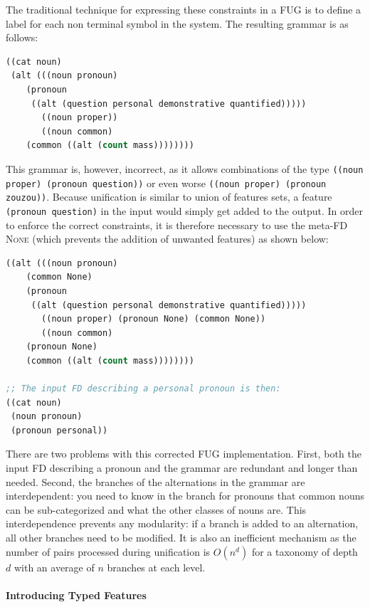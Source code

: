 \documentclass[10pt,a4paper]{report}
\begin{document}
The traditional technique for expressing these constraints in a FUG is to
define a label for each non terminal symbol in the system.  The resulting
grammar is as follows:

\begin{lstlisting}[language=Lisp]
((cat noun)
 (alt (((noun pronoun)
	(pronoun 
	 ((alt (question personal demonstrative quantified)))))
       ((noun proper))
       ((noun common)
	(common ((alt (count mass))))))))
\end{lstlisting}

This grammar is, however, incorrect, as it allows combinations of the type
{\tt ((noun proper) (pronoun question))} or even worse {\tt ((noun proper)
(pronoun zouzou))}.  Because unification is similar to union of features
sets, a feature {\tt (pronoun question)} in the input would simply get added
to the output.  In order to enforce the correct constraints, it is
therefore necessary to use the meta-FD \textsc{None}  (which prevents the addition of unwanted features) as shown below:

\begin{lstlisting}[language=Lisp]
((alt (((noun pronoun)
	(common None)
	(pronoun 
	 ((alt (question personal demonstrative quantified)))))
       ((noun proper) (pronoun None) (common None))
       ((noun common) 
	(pronoun None)
	(common ((alt (count mass))))))))

;; The input FD describing a personal pronoun is then:
((cat noun) 
 (noun pronoun) 
 (pronoun personal))
\end{lstlisting}

There are two problems with this corrected FUG implementation. First,
both the input FD describing a pronoun and the grammar are redundant and
longer than needed.  Second, the branches of the alternations in the
grammar are interdependent: you need to know in the branch for pronouns
that common nouns can be sub-categorized and what the other classes of
nouns are.  This interdependence prevents any modularity: if a branch is
added to an alternation, all other branches need to be modified.  It is
also an inefficient mechanism as the number of pairs processed during
unification is $O(n^d)$ for a taxonomy of depth $d$ with an average of $n$ branches at each level.


\paragraph{Introducing Typed Features}
\end{document}
